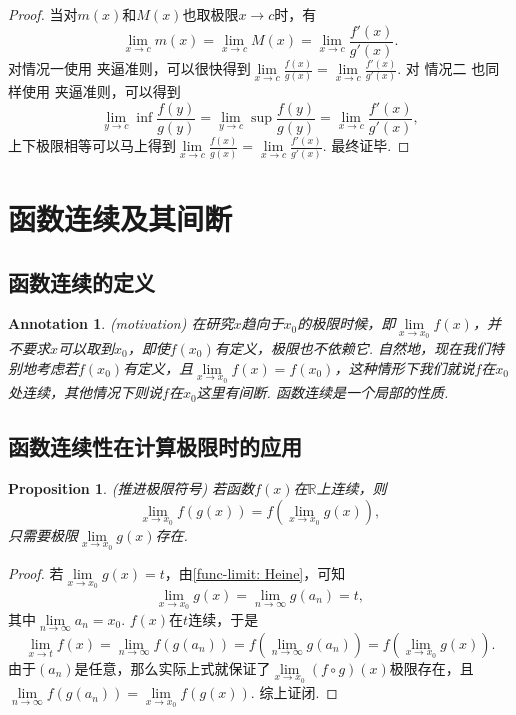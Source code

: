 \documentclass{article}
\newtheorem{proposition}[theorem]{Proposition}
\newtheorem{annotation}[theorem]{Annotation}
\begin{document}
\begin{proof}
当对$m(x)$和$M(x)$也取极限$x \rightarrow c$时，有
$$
\lim\limits_{x \rightarrow c} m(x) = \lim\limits_{x \rightarrow c} M(x) = \lim\limits_{x \rightarrow c} \frac{f'(x)}{g'(x)}.
$$
对{\color{blue}情况一}使用{\color{red} 夹逼准则}，可以很快得到$\lim\limits_{x \rightarrow c} \frac{f(x)}{g(x)} = \lim\limits_{x \rightarrow c} \frac{f'(x)}{g'(x)}$. 对{\color{blue} 情况二 }也同样使用{\color{red} 夹逼准则}，可以得到
$$
\lim\limits_{y \rightarrow c }\inf\frac{f(y)}{g(y)} = \lim\limits_{y \rightarrow c }\sup\frac{f(y)}{g(y)} = \lim\limits_{x \rightarrow c} \frac{f'(x)}{g'(x)},
$$
上下极限相等可以马上得到$\lim\limits_{x \rightarrow c} \frac{f(x)}{g(x)} = \lim\limits_{x \rightarrow c} \frac{f'(x)}{g'(x)}$. 最终证毕.
\end{proof}

\newpage
\section{函数连续及其间断}

\subsection{函数连续的定义}

\begin{annotation}
\rm {\color{red} (motivation)} 在研究$x$趋向于$x_0$的极限时候，即$\lim\limits_{x \rightarrow x_0} f(x)$，并不要求$x$可以取到$x_0$，即使$f(x_0)$有定义，极限也不依赖它. 自然地，现在我们特别地考虑若$f(x_0)$有定义，且$\lim\limits_{x \rightarrow x_0}f(x) = f(x_0)$，这种情形下我们就说$f$在$x_0$处{\color{red}连续}，其他情况下则说$f$在$x_0$这里有{\color{red}间断}. {\color{blue} 函数连续是一个局部的性质}.
\end{annotation}


\subsection{函数连续性在计算极限时的应用}

\begin{proposition}
\rm {\color{red} (推进极限符号)} 若函数$f(x)$在$\mathbb{R}$上连续，则
$$
\lim\limits_{x \rightarrow x_0} f(g(x)) = f(\lim\limits_{x \rightarrow x_0}g(x)),
$$
只需要极限$\lim\limits_{x \rightarrow x_0}g(x)$存在.
\end{proposition}

\begin{proof}
\rm 若$\lim\limits_{x \rightarrow x_0}g(x) = t$，由\ref{func-limit: Heine}，可知
$$
\lim\limits_{x \rightarrow x_0}g(x) = \lim\limits_{n \to \infty} g(a_n) = t,
$$
其中$\lim\limits_{n \to \infty}a_n = x_0$. $f(x)$在$t$连续，于是
$$
\lim\limits_{x \rightarrow t} f(x) = \lim\limits_{n \to \infty} f(g(a_n)) = f(\lim\limits_{n \to \infty}g(a_n)) = f(\lim\limits_{x \rightarrow x_0}g(x)).
$$
由于$(a_n)$是任意，那么实际上式就保证了$\lim\limits_{x \rightarrow x_0}(f \circ g) (x)$极限存在，且$\lim\limits_{n \to \infty} f(g(a_n)) = \lim\limits_{x \rightarrow x_0}f(g(x))$. 综上证闭.	
\end{proof}
\end{document}
